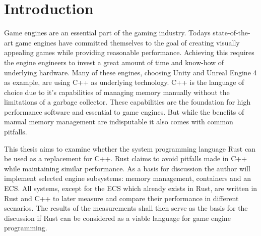 \documentclass[MGS, Master, english]{twbook}
\begin{document}
{{{			\newcommand{\citep}{\citeasnoun}%
			\newcommand{\acessedthrough}{Available at:}%
			\newcommand{\acessedthroughp}{Available through:}%
			\newcommand{\acessedat}{Accessed}%
			\newcommand{\singlepage}{p.}%
			\newcommand{\multiplepages}{pp.}%
			\newcommand{\chapternr}{Ch.}%
			\renewcommand{\harvardand}{\&}%
			\newcommand{\abstractonly}{Abstract only}
			\newcommand{\edition}{~edition}%
}}}

\maketitle

\chapter{Introduction}
Game engines are an essential part of the gaming industry. Todays state-of-the-art game engines have committed themselves to the goal of creating visually appealing games while providing reasonable performance. Achieving this requires the engine engineers to invest a great amount of time and know-how of underlying hardware. Many of these engines, choosing Unity and Unreal Engine 4 as example, are using C++ as underlying technology. C++ is the language of choice due to it's capabilities of managing memory manually without the limitations of a garbage collector. These capabilities are the foundation for high performance software and essential to game engines. But while the benefits of manual memory management are indisputable it also comes with common pitfalls. 

This thesis aims to examine whether the system programming language Rust can be used as a replacement for C++. Rust claims to avoid pitfalls made in C++ while maintaining similar performance. As a basis for discussion the author will implement selected engine subsystems: memory management, containers and an \ac{ECS}. All systems, except for the \ac{ECS} which already exists in Rust, are written in Rust and C++ to later measure and compare their performance in different scenarios. The results of the measurements shall then serve as the basis for the discussion if Rust can be considered as a viable language for game engine programming.
\end{document}
